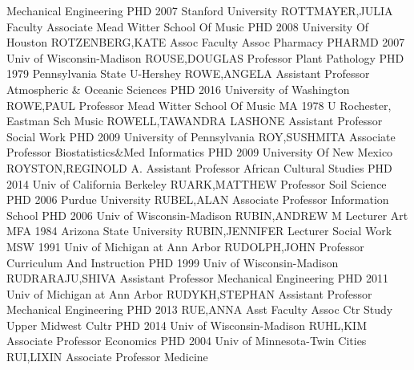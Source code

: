 \documentclass[
]{article}
\begin{document}
\textbar{}  \textbar Mechanical Engineering \textbar PHD
2007 Stanford University \textbar ROTTMAYER,JULIA \textbar Faculty
Associate \textbar{}  \textbar Mead Witter School Of Music
\textbar PHD 2008 University Of Houston \textbar ROTZENBERG,KATE
\textbar Assoc Faculty Assoc \textbar{}  \textbar Pharmacy
\textbar PHARMD 2007 Univ of Wisconsin-Madison \textbar ROUSE,DOUGLAS
\textbar Professor \textbar{}  \textbar Plant Pathology
\textbar PHD 1979 Pennsylvania State U-Hershey \textbar ROWE,ANGELA
\textbar Assistant Professor \textbar{} 
\textbar Atmospheric \& Oceanic Sciences \textbar PHD 2016 University of
Washington \textbar ROWE,PAUL \textbar Professor \textbar{} 
\textbar Mead Witter School Of Music \textbar MA 1978 U Rochester,
Eastman Sch Music \textbar ROWELL,TAWANDRA LASHONE \textbar Assistant
Professor \textbar{}  \textbar Social Work \textbar PHD 2009
University of Pennsylvania \textbar ROY,SUSHMITA \textbar Associate
Professor \textbar{}  \textbar Biostatistics\&Med
Informatics \textbar PHD 2009 University Of New Mexico
\textbar ROYSTON,REGINOLD A. \textbar Assistant Professor \textbar{}
 \textbar African Cultural Studies \textbar PHD 2014 Univ of
California Berkeley \textbar RUARK,MATTHEW \textbar Professor \textbar{}
 \textbar Soil Science \textbar PHD 2006 Purdue University
\textbar RUBEL,ALAN \textbar Associate Professor \textbar{} 
\textbar Information School \textbar PHD 2006 Univ of Wisconsin-Madison
\textbar RUBIN,ANDREW M \textbar Lecturer \textbar{} 
\textbar Art \textbar MFA 1984 Arizona State University
\textbar RUBIN,JENNIFER \textbar Lecturer \textbar{} 
\textbar Social Work \textbar MSW 1991 Univ of Michigan at Ann Arbor
\textbar RUDOLPH,JOHN \textbar Professor \textbar{} 
\textbar Curriculum And Instruction \textbar PHD 1999 Univ of
Wisconsin-Madison \textbar RUDRARAJU,SHIVA \textbar Assistant Professor
\textbar{}  \textbar Mechanical Engineering \textbar PHD
2011 Univ of Michigan at Ann Arbor \textbar RUDYKH,STEPHAN
\textbar Assistant Professor \textbar{}  \textbar Mechanical
Engineering \textbar PHD 2013 \textbar RUE,ANNA \textbar Asst Faculty
Assoc \textbar{}  \textbar Ctr Study Upper Midwest Cultr
\textbar PHD 2014 Univ of Wisconsin-Madison \textbar RUHL,KIM
\textbar Associate Professor \textbar{}  \textbar Economics
\textbar PHD 2004 Univ of Minnesota-Twin Cities \textbar RUI,LIXIN
\textbar Associate Professor \textbar{}  \textbar Medicine
\end{document}
